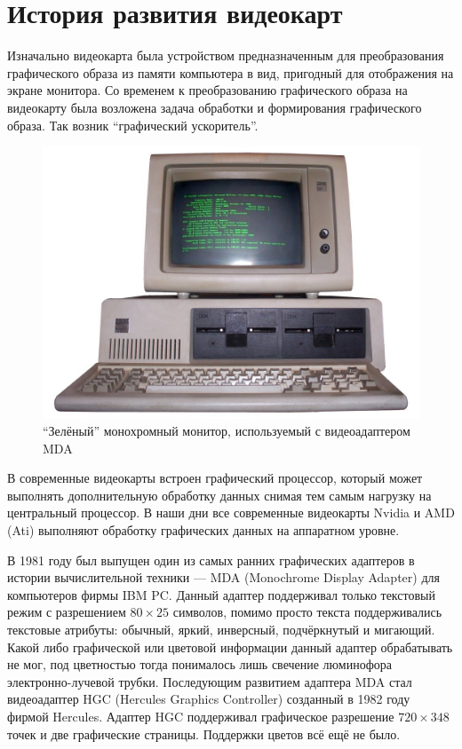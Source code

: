 \section {История развития видеокарт}

Изначально видеокарта была устройством предназначенным для преобразования графического образа из памяти компьютера в вид, пригодный для отображения на экране монитора. Со временем к преобразованию графического образа на видеокарту была возложена задача обработки и формирования графического образа. Так возник ``графический ускоритель''.

\begin{figure}
\includegraphics[width=\linewidth]{img/IBM_PC_5150.jpg}
\caption{``Зелёный'' монохромный монитор, используемый с видеоадаптером MDA}
\end{figure}

В современные видеокарты встроен графический процессор, который может выполнять дополнительную обработку данных снимая тем самым нагрузку на центральный процессор. В наши дни все современные видеокарты Nvidia и AMD (Ati) выполняют обработку графических данных на аппаратном уровне.

В 1981 году был выпущен один из самых ранних графических адаптеров в истории вычислительной техники --- MDA (Monochrome Display Adapter) для компьютеров фирмы IBM PC. Данный адаптер поддерживал только текстовый режим с разрешением $80 \times 25$ символов, помимо просто текста поддерживались текстовые атрибуты: обычный, яркий, инверсный, подчёркнутый и мигающий. Какой либо графической или цветовой информации данный адаптер обрабатывать не мог, под цветностью тогда понималось лишь свечение люминофора электронно-лучевой трубки. Последующим развитием адаптера MDA стал видеоадаптер HGC (Hercules Graphics Controller) созданный в 1982 году фирмой Hercules. Адаптер HGC поддерживал графическое разрешение $720 \times 348$ точек и две графические страницы. Поддержки цветов всё ещё не было.

